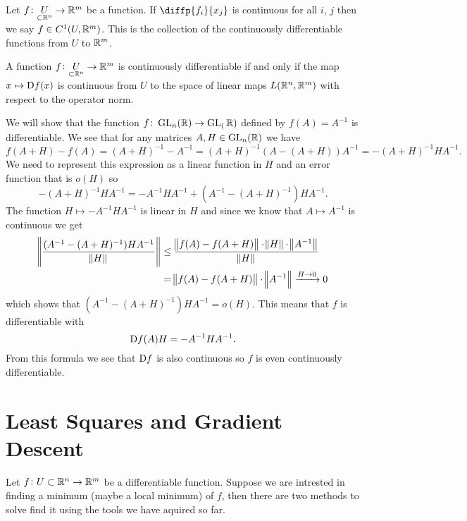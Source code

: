 \documentclass[11pt,a4paper]{article}
\begin{document}
\begin{remark}
  Let $f \colon \underset{\subset \mathbb{R}^n}{U} \to \mathbb{R}^m$ be a function.
  If $\diffp{f_i}{{x_j}}$ is continuous for all $i$, $j$ then we say
  $f \in C^1(U,\mathbb{R}^m)$.
  This is the collection of the continuously differentiable functions from
  $U$ to $\mathbb{R}^m$.
\end{remark}
\begin{remark}
  A function $f \colon \underset{\subset \mathbb{R}^n}{U} \to \mathbb{R}^m$ is continuously
  differentiable if and only if the map $x \mapsto \Dif f(x)$ is continuous
  from $U$ to the space of linear maps $L(\mathbb{R}^n,\mathbb{R}^m)$ with respect to the
  operator norm.
\end{remark}
\begin{example}
  We will show that the function $f \colon \operatorname{GL}_n(\mathbb{R}) \to \operatorname{GL}_(\mathbb{R})$ defined
  by $f(A) = A^{-1}$ is differentiable.
  We see that for any matrices $A, H \in \operatorname{GL}_n(\mathbb{R})$ we have
  \[
    f(A + H) - f(A) =
    (A + H)^{-1} - A^{-1} =
    (A + H)^{-1} (A - (A + H)) A^{-1} =
    - (A + H)^{-1} H A^{-1}.
  \]
  We need to represent this expression as a linear function in $H$ and
  an error function that is $o(H)$ so
  \[
    - (A + H)^{-1} H A^{-1} =
    - A^{-1} H A^{-1} + (A^{-1} - (A + H)^{-1}) H A^{-1}.
  \]
  The function $H \mapsto - A^{-1} H A^{-1}$ is linear in $H$ and
  since we know that $A \mapsto A^{-1}$ is continuous we get
  \begin{align*}
    \norm{\frac{(A^{-1} - (A + H)^{-1}) H A^{-1}}{\norm{H}}} &\le
    \frac{\norm{f(A) - f(A + H)} \cdot \norm{H} \cdot 
    \norm{A^{-1}}}{\norm{H}} \\ &=
    \norm{f(A) - f(A + H)} \cdot \norm{A^{-1}} \xrightarrow{H \to 0} 0
  \end{align*}
  which shows that $(A^{-1} - (A + H)^{-1}) H A^{-1} = o(H)$.
  This means that $f$ is differentiable with
  \[
    \Dif f(A)H = - A^{-1} H A^{-1}.
  \]
  From this formula we see that $\Dif f$ is also continuous so $f$ is
  even continuously differentiable.
\end{example}



\newpage

\section{Least Squares and Gradient Descent}
Let $f \colon U \subset \mathbb{R}^n \to \mathbb{R}^m$ be a differentiable function.
Suppose we are intrested in finding a minimum (maybe a local minimum) of $f$,
then there are two methods to solve find it using the tools we have aquired
so far.
\end{document}
